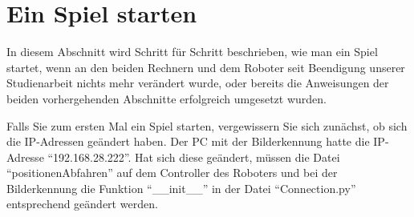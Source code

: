 \section{Ein Spiel starten}
\label{starten}
In diesem Abschnitt wird Schritt für Schritt beschrieben, wie man ein Spiel startet, wenn an den beiden Rechnern und dem Roboter seit Beendigung unserer Studienarbeit nichts mehr verändert wurde, oder bereits die Anweisungen der beiden vorhergehenden Abschnitte erfolgreich umgesetzt wurden. 

Falls Sie zum ersten Mal ein Spiel starten, vergewissern Sie sich zunächst, ob sich die IP-Adressen geändert haben. Der PC mit der Bilderkennung hatte die IP-Adresse \enquote{192.168.28.222}. Hat sich diese geändert, müssen die Datei \enquote{positionenAbfahren} auf dem Controller des Roboters und bei der Bilderkennung die Funktion \enquote{\_\_init\_\_} in der Datei \enquote{Connection.py} entsprechend geändert werden. 

